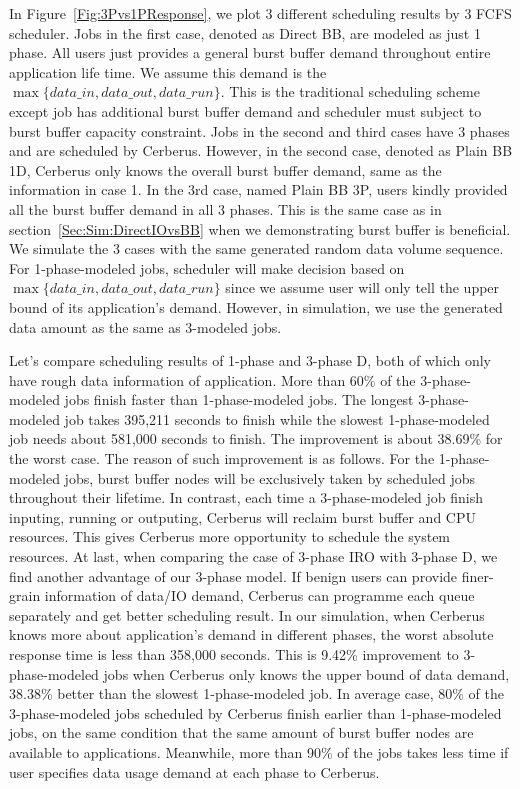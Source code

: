 In Figure~\ref{Fig:3Pvs1PResponse}, we plot 3 different scheduling results by 3 FCFS scheduler.
Jobs in the first case, denoted as Direct BB, are modeled as just 1 phase.
All users just provides a general burst buffer demand throughout entire application life time.
We assume this demand is the $\max \{data\_in, data\_out, data\_run\}$.
This is the traditional scheduling scheme except job has additional
burst buffer demand and scheduler must subject to burst buffer capacity constraint.
Jobs in the second and third cases have 3 phases and are scheduled by Cerberus.
However, in the second case, denoted as Plain BB 1D, Cerberus only knows
the overall burst buffer demand, same as the information in case 1.
In the 3rd case, named Plain BB 3P,
users kindly provided all the burst buffer demand in all 3 phases.
This is the same case as in section~\ref{Sec:Sim:DirectIOvsBB}
when we demonstrating burst buffer is beneficial.
We simulate the 3 cases with the same generated random data volume sequence.
For 1-phase-modeled jobs, scheduler will make decision
based on $\max \{data\_in, data\_out, data\_run\}$
since we assume user will only tell the upper bound of its application's demand.
However, in simulation, we use the generated data amount as the same as 3-modeled jobs.

Let's compare scheduling results of 1-phase and 3-phase D,
both of which only have rough data information of application.
More than 60\% of the 3-phase-modeled jobs finish faster than 1-phase-modeled jobs.
The longest 3-phase-modeled job takes 395,211 seconds to finish
while the slowest 1-phase-modeled job needs about 581,000 seconds to finish.
The improvement is about 38.69\% for the worst case.
The reason of such improvement is as follows.
For the 1-phase-modeled jobs, burst buffer nodes will be exclusively taken by scheduled jobs
throughout their lifetime.
In contrast, each time a 3-phase-modeled job finish inputing, running or outputing,
Cerberus will reclaim burst buffer and CPU resources.
This gives Cerberus more opportunity to schedule the system resources.
At last, when comparing the case of 3-phase IRO with 3-phase D,
we find another advantage of our 3-phase model.
If benign users can provide finer-grain information of data/IO demand,
Cerberus can programme each queue separately and get better scheduling result.
In our simulation, when Cerberus knows more about application's demand in different phases,
the worst absolute response time is less than 358,000 seconds.
This is 9.42\% improvement to 3-phase-modeled jobs
when Cerberus only knows the upper bound of data demand,
38.38\% better than the slowest 1-phase-modeled job.
In average case, 80\% of the 3-phase-modeled jobs scheduled by Cerberus
finish earlier than 1-phase-modeled jobs,
on the same condition that the same amount of burst buffer nodes are available to applications.
Meanwhile, more than 90\% of the jobs takes less time if user specifies data usage demand
at each phase to Cerberus.

